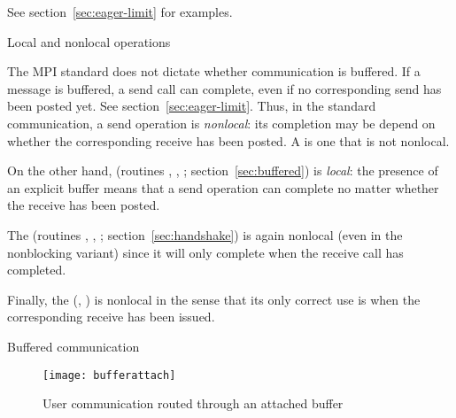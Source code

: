 See section~\ref{sec:eager-limit} for examples.


 {Local and nonlocal operations}
\label{sec:mpi-local-non}
\label{sec:local-non-send}

The MPI standard does not dictate whether communication is buffered.
If a message is buffered, a send call can complete,
even if no corresponding send has been posted yet.
See section~\ref{sec:eager-limit}.
Thus, in the standard communication, a send operation
is \emph{nonlocal}: its completion may be depend on
whether the corresponding receive has been posted.
A  is one that is not nonlocal.

On the other hand, 
(routines , ,
; section~\ref{sec:buffered})
is \emph{local}:
the presence of an explicit buffer means that a send operation
can complete no matter whether the receive has been posted.

The  
(routines , ,
; section~\ref{sec:handshake})
is again nonlocal (even in the nonblocking variant)
since it will only complete when the receive call has completed.

Finally, the 
(, )
is nonlocal in the sense that its only correct use
is when the corresponding receive has been issued.


 {Buffered communication}
\label{sec:buffered}

\begin{figure}[ht]
  \texttt{[image: bufferattach]}
  \caption{User communication routed through an attached buffer}
  \label{fig:bufattach}
\end{figure}

